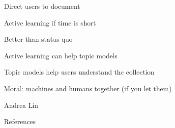 \documentclass[compress]{beamer}
\newcommand{\fsi}[2]{
\begin{frame}[plain]
\vspace*{-1pt}
\makebox[\linewidth]{\texttt{[image: \#1]}}
\begin{center}
#2
\end{center}
\end{frame}
}
\begin{document}
\fsi{interactive_topic_models/alto_interface}{}
\fsi{interactive_topic_models/alto_interface_highlight}{Direct users
  to document}



\fsi{interactive_topic_models/alto/user_talk_1}{ Active learning if time is short}
\fsi{interactive_topic_models/alto/user_talk_2}{ Better than status quo}
\fsi{interactive_topic_models/alto/user_talk_3}{ Active learning can
  help topic models }
\fsi{interactive_topic_models/alto/user_talk_4}{ Topic models help
  users understand the collection }
\fsi{interactive_topic_models/alto/user_talk_4}{ Moral: machines and
  humans together (if you let them) }


\fsi{qb/viz_first_draft}{Andrea Lin}


\begin{frame}{References}

\tiny

\end{frame}
\end{document}

